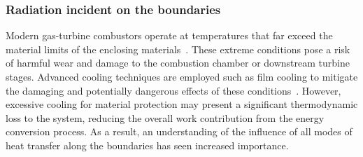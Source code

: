 \subsubsection{Radiation incident on the boundaries}

Modern gas-turbine combustors operate at temperatures that far exceed the material limits of the enclosing materials~\cite{Padture2016AdvancedPropulsion}.
These extreme conditions pose a risk of harmful wear and damage to the combustion chamber or downstream turbine stages. Advanced cooling techniques are employed such as film cooling to mitigate the damaging and potentially dangerous effects of these conditions~\cite{Amano2008ThermalSystems}. However, excessive cooling for material protection may present a significant thermodynamic loss to the system, reducing the overall work contribution from the energy conversion process.
As a result, an understanding of the influence of all modes of heat transfer along the boundaries has seen increased importance.

